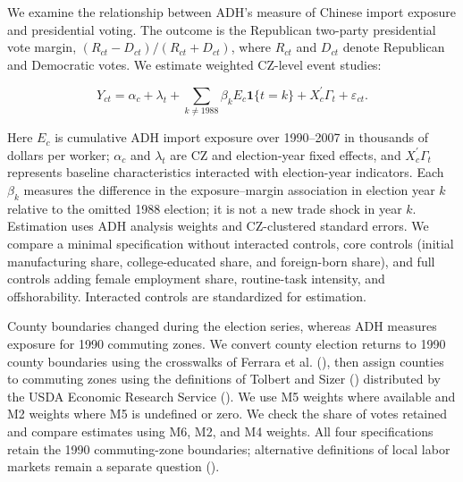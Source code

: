 \documentclass[
  11pt,
]{article}
\begin{document}
We examine the relationship between ADH's measure of Chinese import
exposure and presidential voting. The outcome is the Republican
two-party presidential vote margin, \((R_{ct}-D_{ct})/(R_{ct}+D_{ct})\),
where \(R_{ct}\) and \(D_{ct}\) denote Republican and Democratic votes.
We estimate weighted CZ-level event studies:

\[
Y_{ct} = \alpha_c + \lambda_t + \sum_{k \ne 1988} \beta_k E_c \mathbf{1}\{t=k\} + X_c^{\prime}\Gamma_t + \varepsilon_{ct}.
\]

Here \(E_c\) is cumulative ADH import exposure over 1990--2007 in
thousands of dollars per worker; \(\alpha_c\) and \(\lambda_t\) are CZ
and election-year fixed effects, and \(X_c^{\prime}\Gamma_t\) represents
baseline characteristics interacted with election-year indicators. Each
\(\beta_k\) measures the difference in the exposure--margin association
in election year \(k\) relative to the omitted 1988 election; it is not
a new trade shock in year \(k\). Estimation uses ADH analysis weights
and CZ-clustered standard errors. We compare a minimal specification
without interacted controls, core controls (initial manufacturing share,
college-educated share, and foreign-born share), and full controls
adding female employment share, routine-task intensity, and
offshorability. Interacted controls are standardized for estimation.

County boundaries changed during the election series, whereas ADH
measures exposure for 1990 commuting zones. We convert county election
returns to 1990 county boundaries using the crosswalks of Ferrara et al.
(), then assign counties to
commuting zones using the definitions of Tolbert and Sizer
() distributed by the USDA Economic
Research Service (). We use M5 weights where
available and M2 weights where M5 is undefined or zero. We check the
share of votes retained and compare estimates using M6, M2, and M4
weights. All four specifications retain the 1990 commuting-zone
boundaries; alternative definitions of local labor markets remain a
separate question ().
\end{document}
